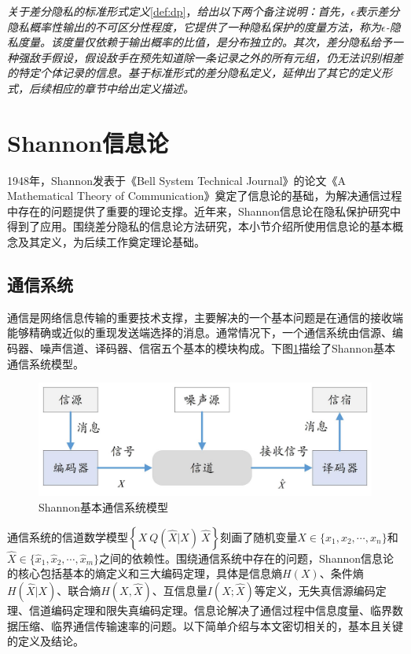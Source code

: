 \begin{remark}{\em
关于差分隐私的标准形式定义}\ref{def:dp}，{\em 给出以下两个备注说明：首先，$\epsilon$表示差分隐私概率性输出的不可区分性程度，它提供了一种隐私保护的度量方法，称为$\epsilon$-隐私度量。该度量仅依赖于输出概率的比值，是分布独立的。其次，差分隐私给予一种强敌手假设，假设敌手在预先知道除一条记录之外的所有元组，仍无法识别相差的特定个体记录的信息。基于标准形式的差分隐私定义，延伸出了其它的定义形式，后续相应的章节中给出定义描述。}
\end{remark}
\section{Shannon信息论}
1948年，Shannon\cite{shannon1948a}发表于《Bell System Technical Journal》的论文《A Mathematical Theory of Communication》奠定了信息论的基础，为解决通信过程中存在的问题提供了重要的理论支撑。近年来，Shannon信息论在隐私保护研究中得到了应用。围绕差分隐私的信息论方法研究，本小节介绍所使用信息论的基本概念及其定义，为后续工作奠定理论基础。
\subsection{通信系统}\label{sec:shannon_comunication_system}
通信是网络信息传输的重要技术支撑，主要解决的一个基本问题是在通信的接收端能够精确或近似的重现发送端选择的消息。通常情况下，一个通信系统由信源、编码器、噪声信道、译码器、信宿五个基本的模块构成\cite{shannon1948a}。下图\ref{fig:chapter03-communication-model}描绘了Shannon基本通信系统模型。
\begin{figure}[htbp]
	\centering
	\includegraphics[width = 0.65\linewidth]{./figures/chapter03_1.jpg}
	\caption{Shannon基本通信系统模型}
	\label{fig:chapter03-communication-model}
\end{figure}

通信系统的信道数学模型$\left\{X~ Q(\hat{X}|X)~\hat{X}\right\}$刻画了随机变量$X\in\{x_1,x_2,\cdots,x_n\}$和$\hat{X}\in\{\hat{x}_1,\hat{x}_2,\cdots,\hat{x}_m\}$之间的依赖性。围绕通信系统中存在的问题，Shannon信息论的核心包括基本的熵定义和三大编码定理，具体是信息熵$H(X)$、条件熵$H(\hat{X}|X)$、联合熵$H(X,\hat{X})$、互信息量$I(X;\hat{X})$等定义，无失真信源编码定理、信道编码定理和限失真编码定理\cite{shannon1948a,Shannon1959Coding,cover2006elements}。信息论解决了通信过程中信息度量、临界数据压缩、临界通信传输速率的问题。以下简单介绍与本文密切相关的，基本且关键的定义及结论。
